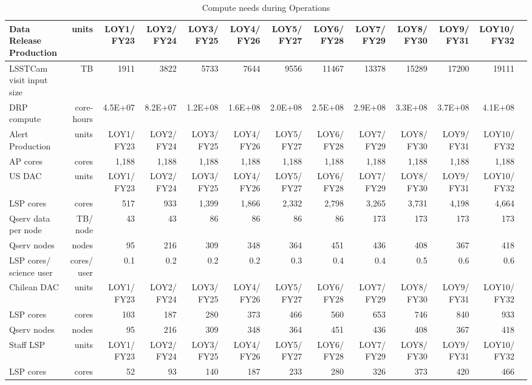 \tiny \begin{longtable} { |p{}  |r  |r  |r  |r  |r  |r  |r  |r  |r  |r  |r  |r |} 
\caption{Compute needs during Operations \label{tab:computeSizingOps}}\\ 
\hline 
\textbf{Data Release Production}&\textbf{units}&\textbf{LOY1/ FY23}&\textbf{LOY2/ FY24}&\textbf{LOY3/ FY25}&\textbf{LOY4/ FY26}&\textbf{LOY5/ FY27}&\textbf{LOY6/ FY28}&\textbf{LOY7/ FY29}&\textbf{LOY8/ FY30}&\textbf{LOY9/ FY31}&\textbf{LOY10/ FY32} \\ \hline
{LSSTCam visit input size}&{TB}&{1911}&{3822}&{5733}&{7644}&{9556}&{11467}&{13378}&{15289}&{17200}&{19111} \\ \hline
{DRP compute}&{core-hours}&{4.5E+07}&{8.2E+07}&{1.2E+08}&{1.6E+08}&{2.0E+08}&{2.5E+08}&{2.9E+08}&{3.3E+08}&{3.7E+08}&{4.1E+08} \\ \hline
{Alert Production}&{units}&{LOY1/ FY23}&{LOY2/ FY24}&{LOY3/ FY25}&{LOY4/ FY26}&{LOY5/ FY27}&{LOY6/ FY28}&{LOY7/ FY29}&{LOY8/ FY30}&{LOY9/ FY31}&{LOY10/ FY32} \\ \hline
{AP cores}&{cores}&{1,188}&{1,188}&{1,188}&{1,188}&{1,188}&{1,188}&{1,188}&{1,188}&{1,188}&{1,188} \\ \hline
{US DAC}&{units}&{LOY1/ FY23}&{LOY2/ FY24}&{LOY3/ FY25}&{LOY4/ FY26}&{LOY5/ FY27}&{LOY6/ FY28}&{LOY7/ FY29}&{LOY8/ FY30}&{LOY9/ FY31}&{LOY10/ FY32} \\ \hline
{LSP cores}&{cores}&{517}&{933}&{1,399}&{1,866}&{2,332}&{2,798}&{3,265}&{3,731}&{4,198}&{4,664} \\ \hline
{Qserv data per node}&{TB/ node}&{43}&{43}&{86}&{86}&{86}&{86}&{173}&{173}&{173}&{173} \\ \hline
{Qserv nodes}&{nodes}&{95}&{216}&{309}&{348}&{364}&{451}&{436}&{408}&{367}&{418} \\ \hline
{LSP cores/ science user}&{cores/ user}&{0.1}&{0.2}&{0.2}&{0.2}&{0.3}&{0.4}&{0.4}&{0.5}&{0.6}&{0.6} \\ \hline
{Chilean DAC}&{units}&{LOY1/ FY23}&{LOY2/ FY24}&{LOY3/ FY25}&{LOY4/ FY26}&{LOY5/ FY27}&{LOY6/ FY28}&{LOY7/ FY29}&{LOY8/ FY30}&{LOY9/ FY31}&{LOY10/ FY32} \\ \hline
{LSP cores}&{cores}&{103}&{187}&{280}&{373}&{466}&{560}&{653}&{746}&{840}&{933} \\ \hline
{Qserv nodes}&{nodes}&{95}&{216}&{309}&{348}&{364}&{451}&{436}&{408}&{367}&{418} \\ \hline
{Staff LSP}&{units}&{LOY1/ FY23}&{LOY2/ FY24}&{LOY3/ FY25}&{LOY4/ FY26}&{LOY5/ FY27}&{LOY6/ FY28}&{LOY7/ FY29}&{LOY8/ FY30}&{LOY9/ FY31}&{LOY10/ FY32} \\ \hline
{LSP cores}&{cores}&{52}&{93}&{140}&{187}&{233}&{280}&{326}&{373}&{420}&{466} \\ \hline
\end{longtable} \normalsize
